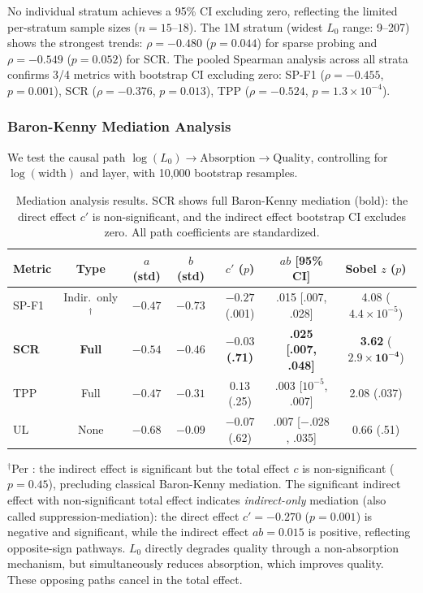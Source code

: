 \documentclass{article}
\begin{document}
No individual stratum achieves a 95\% CI excluding zero, reflecting the limited per-stratum sample sizes ($n = 15$--$18$).
The 1M stratum (widest $L_0$ range: 9--207) shows the strongest trends: $\rho = -0.480$ ($p = 0.044$) for sparse probing and $\rho = -0.549$ ($p = 0.052$) for SCR.
The pooled Spearman analysis across all strata confirms 3/4 metrics with bootstrap CI excluding zero: SP-F1 ($\rho = -0.455$, $p = 0.001$), SCR ($\rho = -0.376$, $p = 0.013$), TPP ($\rho = -0.524$, $p = 1.3 \times 10^{-4}$).

\subsubsection{Baron-Kenny Mediation Analysis}

We test the causal path $\log(L_0) \to \text{Absorption} \to \text{Quality}$, controlling for $\log(\text{width})$ and layer, with 10,000 bootstrap resamples.

\begin{table}[t]
\caption{Mediation analysis results. SCR shows full Baron-Kenny mediation (bold): the direct effect $c'$ is non-significant, and the indirect effect bootstrap CI excludes zero. All path coefficients are standardized.}
\label{tab:mediation}
\centering
\footnotesize
\setlength{\tabcolsep}{3.5pt}
\begin{tabular}{@{}lcccccc@{}}
\toprule
Metric & Type & $a$ (std) & $b$ (std) & $c'$ ($p$) & $ab$ [95\% CI] & Sobel $z$ ($p$) \\
\midrule
SP-F1 & Indir.\ only$^\dagger$ & $-0.47$ & $-0.73$ & $-0.27$ (.001) & .015 [.007, .028] & 4.08 ($4.4{\times}10^{-5}$) \\
\textbf{SCR} & \textbf{Full} & $\mathbf{-0.54}$ & $\mathbf{-0.46}$ & $\mathbf{-0.03}$ \textbf{(.71)} & \textbf{.025 [.007, .048]} & \textbf{3.62} ($\mathbf{2.9{\times}10^{-4}}$) \\
TPP & Full & $-0.47$ & $-0.31$ & $0.13$ (.25) & .003 [$10^{-5}$, .007] & 2.08 (.037) \\
UL & None & $-0.68$ & $-0.09$ & $-0.07$ (.62) & .007 [$-.028$, .035] & 0.66 (.51) \\
\bottomrule
\end{tabular}
\vspace{0.5em}

{\footnotesize $^\dagger$Per \citet{zhao2010reconsidering}: the indirect effect is significant but the total effect $c$ is non-significant ($p = 0.45$), precluding classical Baron-Kenny mediation. The significant indirect effect with non-significant total effect indicates \emph{indirect-only} mediation (also called suppression-mediation): the direct effect $c' = -0.270$ ($p = 0.001$) is negative and significant, while the indirect effect $ab = 0.015$ is positive, reflecting opposite-sign pathways. $L_0$ directly degrades quality through a non-absorption mechanism, but simultaneously reduces absorption, which improves quality. These opposing paths cancel in the total effect.}
\end{table}
\end{document}
